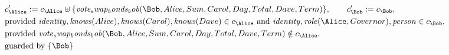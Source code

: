 \begin{align*}
&
c'_
{
\Alice
}
 := 
c_
{
\Alice
}
 \uplus 
\{
\mathit{
vote_swap_bonds_bob
}
(
\Bob
,
Alice
,
Sum
,
Carol
,
Day
,
Total
,
Dave
,
Term
)
\}
, \qquad 
c'_
{
\Bob
}
 := 
c_
{
\Bob
}
,\\
&
\text{provided } 
\mathit{
identity
}
,
\mathit{
knows
}
(
Alice
)
,
\mathit{
knows
}
(
Carol
)
,
\mathit{
knows
}
(
Dave
)
 \in c_
{
\Alice
}
 \text{ and } 
\mathit{
identity
}
,
\mathit{
role
}
(
\Alice
,
Governor
)
,
\mathit{
person
}
 \in c_
{
\Bob
}
,\\
&
\text{provided } 
\mathit{
vote_swap_bonds_bob
}
(
\Bob
,
Alice
,
Sum
,
Carol
,
Day
,
Total
,
Dave
,
Term
)
 \notin c_
{
\Alice
}
,\\
&
\text{guarded by } \{
\Bob
\}
\end{align*}

